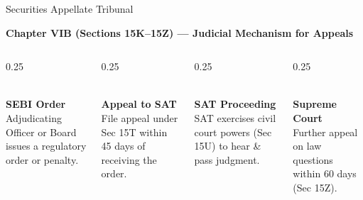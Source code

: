 \documentclass[aspectratio=169,10pt]{beamer}
\begin{document}
	\begin{frame}{Securities Appellate Tribunal}
		\vspace{0.1cm}
		\begin{center}
			\textcolor{rpIris}{\textbf{Chapter VIB (Sections 15K--15Z) --- Judicial Mechanism for Appeals}}
		\end{center}
		\vspace{0.3cm}
		\begin{columns}[T, onlytextwidth]
			\begin{column}{0.25\textwidth}
				\centering
				\\[4pt]
				\textcolor{rpRose}{\textbf{\small SEBI Order}}\\[2pt]
				\textcolor{rpText}{\scriptsize Adjudicating Officer or Board issues a regulatory order or penalty.}
			\end{column}
			\begin{column}{0.25\textwidth}
				\centering
				\\[4pt]
				\textcolor{rpRose}{\textbf{\small Appeal to SAT}}\\[2pt]
				\textcolor{rpText}{\scriptsize File appeal under Sec 15T within 45 days of receiving the order.}
			\end{column}
			\begin{column}{0.25\textwidth}
				\centering
				\\[4pt]
				\textcolor{rpRose}{\textbf{\small SAT Proceeding}}\\[2pt]
				\textcolor{rpText}{\scriptsize SAT exercises civil court powers (Sec 15U) to hear \& pass judgment.}
			\end{column}
			\begin{column}{0.25\textwidth}
				\centering
				\\[4pt]
				\textcolor{rpRose}{\textbf{\small Supreme Court}}\\[2pt]
				\textcolor{rpText}{\scriptsize Further appeal on law questions within 60 days (Sec 15Z).}
			\end{column}
		\end{columns}
	\end{frame}
	
\end{document}
